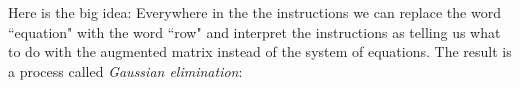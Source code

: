 Here is the big idea: 
Everywhere in the the instructions we can replace the word ``equation" with the word ``row" and interpret the instructions as telling us what to do with the augmented matrix instead of the system of equations.
The result is a process called {\itshape Gaussian elimination}: 
%
%


